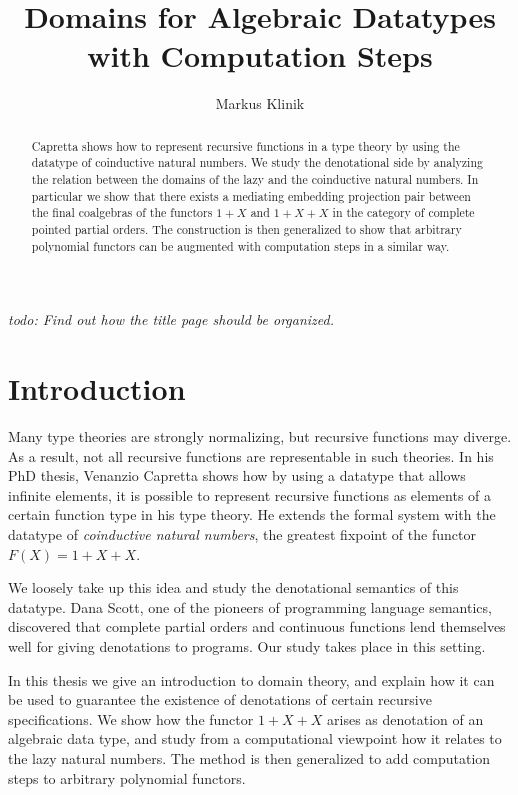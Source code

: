 \documentclass[a4paper]{article}
\newcommand{\todo}[1]{\smallskip \noindent \emph{todo: #1} \smallskip}
\begin{document}
\title{Domains for Algebraic Datatypes with Computation Steps}
\author{Markus Klinik}
\maketitle

\todo{Find out how the title page should be organized.}

\begin{abstract}

Capretta \cite{Capretta2002} shows how to represent recursive functions in a
type theory by using the datatype of coinductive natural numbers. We study the
denotational side by analyzing the relation between the domains of the lazy and
the coinductive natural numbers.  In particular we show that there exists a
mediating em\-bed\-ding projection pair between the final coalgebras of the
functors $1+X$ and $1+X+X$ in the category of complete pointed partial orders.
The construction is then generalized to show that arbitrary polynomial functors
can be augmented with computation steps in a similar way.

\end{abstract}

\section{Introduction}

Many type theories are strongly normalizing, but recursive functions may
diverge.  As a result, not all recursive functions are representable in such
theories. In his PhD thesis, Venanzio Capretta \cite{Capretta2002} shows how by
using a datatype that allows infinite elements, it is possible to represent
recursive functions as elements of a certain function type in his type theory.
He extends the formal system with the datatype of \emph{coinductive natural
numbers}, the greatest fixpoint of the functor $F(X) = 1 + X + X$.

We loosely take up this idea and study the denotational semantics of this
datatype. Dana Scott, one of the pioneers of programming language semantics,
discovered that complete partial orders and continuous functions lend themselves
well for giving denotations to programs. Our study takes place in this setting.

In this thesis we give an introduction to domain theory, and explain how it can
be used to guarantee the existence of denotations of certain recursive
specifications. We show how the functor $1+X+X$ arises as denotation of an
algebraic data type, and study from a computational viewpoint how it relates to
the lazy natural numbers. The method is then generalized to add computation
steps to arbitrary polynomial functors.
\end{document}
